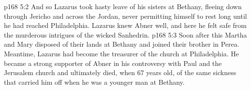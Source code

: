 \vs p168 5:2 And so Lazarus took hasty leave of his sisters at Bethany, fleeing down through Jericho and across the Jordan, never permitting himself to rest long until he had reached Philadelphia. Lazarus knew Abner well, and here he felt safe from the murderous intrigues of the wicked Sanhedrin.
\vs p168 5:3 Soon after this Martha and Mary disposed of their lands at Bethany and joined their brother in Perea. Meantime, Lazarus had become the treasurer of the church at Philadelphia. He became a strong supporter of Abner in his controversy with Paul and the Jerusalem church and ultimately died, when 67 years old, of the same sickness that carried him off when he was a younger man at Bethany.
\quizlink
